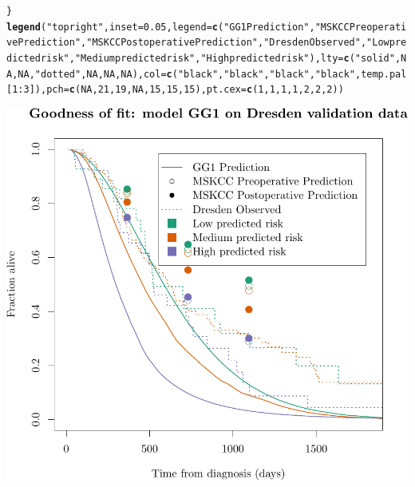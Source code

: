 \documentclass{article}\usepackage[]{graphicx}\usepackage[]{color}
\makeatletter
\def\maxwidth{ %
  \ifdim\Gin@nat@width>\linewidth
    \linewidth
  \else
    \Gin@nat@width
  \fi
}
\newcommand{\hlnum}[1]{\textcolor[rgb]{0.686,0.059,0.569}{#1}}%
\newcommand{\hlstr}[1]{\textcolor[rgb]{0.192,0.494,0.8}{#1}}%
\newcommand{\hlopt}[1]{\textcolor[rgb]{0,0,0}{#1}}%
\newcommand{\hlstd}[1]{\textcolor[rgb]{0.345,0.345,0.345}{#1}}%
\newcommand{\hlkwc}[1]{\textcolor[rgb]{0.333,0.667,0.333}{#1}}%
\newcommand{\hlkwd}[1]{\textcolor[rgb]{0.737,0.353,0.396}{\textbf{#1}}}%
\newenvironment{kframe}{%
 \def\at@end@of@kframe{}%
 \ifinner\ifhmode%
  \def\at@end@of@kframe{\end{minipage}}%
  \begin{minipage}{\columnwidth}%
 \fi\fi%
 \def\FrameCommand##1{\hskip\@totalleftmargin \hskip-\fboxsep
 \colorbox{shadecolor}{##1}\hskip-\fboxsep
     \hskip-\linewidth \hskip-\@totalleftmargin \hskip\columnwidth}%
 \MakeFramed {\advance\hsize-\width
   \@totalleftmargin\z@ \linewidth\hsize
   \@setminipage}}%
 {\par\unskip\endMakeFramed%
 \at@end@of@kframe}
\newenvironment{knitrout}{}{} %
\makeatother
\begin{document}
\begin{knitrout}
\begin{kframe}
\begin{alltt}
\hlstd{\}}
\hlkwd{legend}\hlstd{(}\hlstr{"topright"}\hlstd{,} \hlkwc{inset} \hlstd{=} \hlnum{0.05}\hlstd{,} \hlkwc{legend} \hlstd{=} \hlkwd{c}\hlstd{(}\hlstr{"GG1 Prediction"}\hlstd{,} \hlstr{"MSKCC Preoperative Prediction"}\hlstd{,} \hlstr{"MSKCC Postoperative Prediction"}\hlstd{,} \hlstr{"Dresden Observed"}\hlstd{,} \hlstr{"Low predicted risk"}\hlstd{,} \hlstr{"Medium predicted risk"}\hlstd{,} \hlstr{"High predicted risk"}\hlstd{),} \hlkwc{lty} \hlstd{=} \hlkwd{c}\hlstd{(}\hlstr{"solid"}\hlstd{,} \hlnum{NA}\hlstd{,} \hlnum{NA}\hlstd{,} \hlstr{"dotted"}\hlstd{,} \hlnum{NA}\hlstd{,} \hlnum{NA}\hlstd{,} \hlnum{NA}\hlstd{),} \hlkwc{col} \hlstd{=} \hlkwd{c}\hlstd{(}\hlstr{"black"}\hlstd{,} \hlstr{"black"}\hlstd{,} \hlstr{"black"}\hlstd{,} \hlstr{"black"}\hlstd{, temp.pal[}\hlnum{1}\hlopt{:}\hlnum{3}\hlstd{]),} \hlkwc{pch} \hlstd{=} \hlkwd{c}\hlstd{(}\hlnum{NA}\hlstd{,} \hlnum{21}\hlstd{,} \hlnum{19}\hlstd{,} \hlnum{NA}\hlstd{,} \hlnum{15}\hlstd{,} \hlnum{15}\hlstd{,} \hlnum{15}\hlstd{),} \hlkwc{pt.cex} \hlstd{=} \hlkwd{c}\hlstd{(}\hlnum{1}\hlstd{,} \hlnum{1}\hlstd{,} \hlnum{1}\hlstd{,} \hlnum{1}\hlstd{,} \hlnum{2}\hlstd{,} \hlnum{2}\hlstd{,} \hlnum{2}\hlstd{))}
\end{alltt}
\end{kframe}

{\centering \includegraphics[width=\maxwidth]{figure/07-altman-4-dresden-1} 

}



\end{knitrout}
\end{document}
